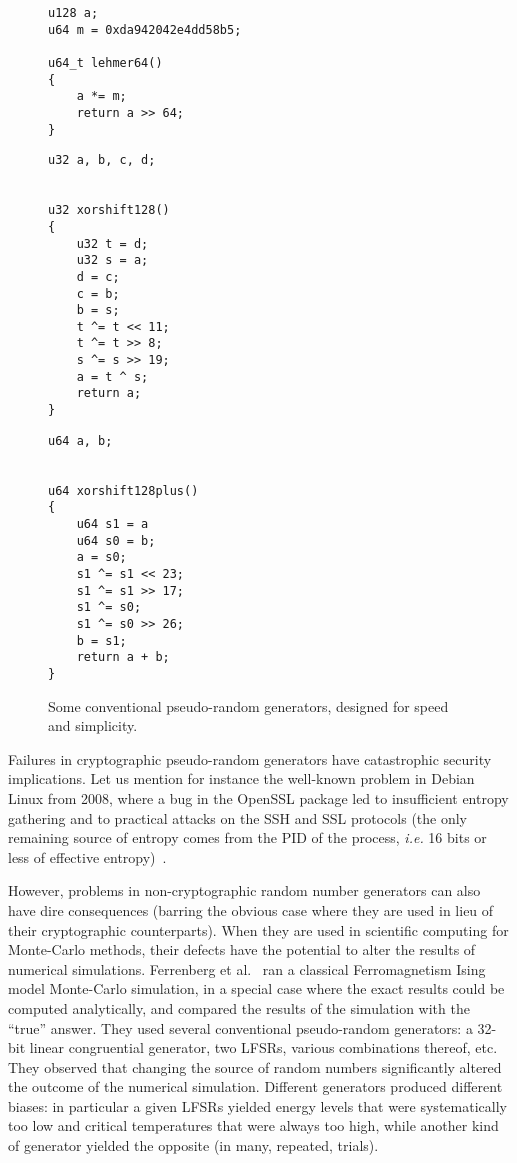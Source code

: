 \documentclass[submission,svgnames,journal=tosc]{iacrtrans}
\begin{document}
\begin{figure}
  \begin{minipage}[t]{5cm}
\begin{verbatim}
u128 a;
u64 m = 0xda942042e4dd58b5;

u64_t lehmer64() 
{
    a *= m;
    return a >> 64;
}
\end{verbatim}
  \end{minipage}
    \begin{minipage}[t]{4cm}
\begin{verbatim}
u32 a, b, c, d;


u32 xorshift128()
{
    u32 t = d;
    u32 s = a;
    d = c;
    c = b;
    b = s;
    t ^= t << 11;
    t ^= t >> 8;
    s ^= s >> 19;
    a = t ^ s;
    return a;
}
\end{verbatim}
    \end{minipage}
    \begin{minipage}[t]{4cm}
\begin{verbatim}
u64 a, b;


u64 xorshift128plus()
{
    u64 s1 = a
    u64 s0 = b;
    a = s0;
    s1 ^= s1 << 23;        
    s1 ^= s1 >> 17;        
    s1 ^= s0;        
    s1 ^= s0 >> 26;
    b = s1;
    return a + b;
}
\end{verbatim}
    \end{minipage}
    \caption{Some conventional pseudo-random generators, designed for speed and simplicity.}
    \label{fig:prngs}
  \end{figure}
  
Failures in cryptographic pseudo-random generators have catastrophic security
implications. Let us mention for instance the well-known problem in Debian
Linux from 2008, where a bug in the OpenSSL package led to insufficient
entropy gathering and to practical attacks on the SSH and SSL protocols (the
only remaining source of entropy comes from the PID of the process,
\textit{i.e.} 16 bits or less of effective entropy)~\cite{YilekRSES09}.

However, problems in non-cryptographic random number generators can also have
dire consequences (barring the obvious case where they are used in lieu of their
cryptographic counterparts). When they are used in scientific computing for
Monte-Carlo methods, their defects have the potential to alter the results of
numerical simulations. Ferrenberg et al.~\cite{Ferrenberg92} ran a classical
Ferromagnetism Ising model Monte-Carlo simulation, in a special case where the
exact results could be computed analytically, and compared the results of the
simulation with the ``true'' answer. They used several conventional
pseudo-random generators: a 32-bit linear congruential generator, two LFSRs,
various combinations thereof, etc. They observed that changing the source of
random numbers significantly altered the outcome of the numerical
simulation. Different generators produced different biases: in particular a
given LFSRs yielded energy levels that were systematically too low and critical
temperatures that were always too high, while another kind of generator yielded
the opposite (in many, repeated, trials).
\end{document}
